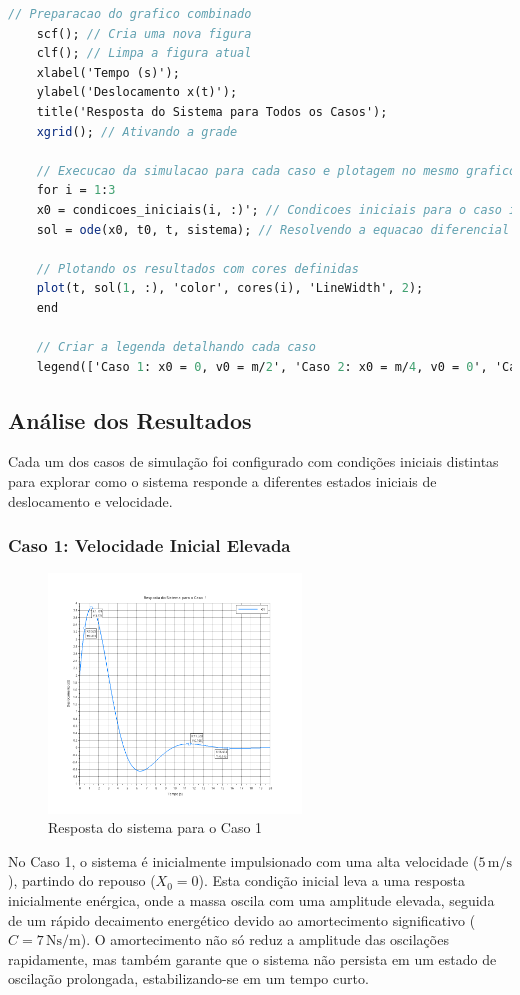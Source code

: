 \begin{lstlisting}[language=Scilab, caption=Código Scilab para simular a resposta do sistema massa-mola-amortecedor]
    // Preparacao do grafico combinado
    scf(); // Cria uma nova figura
    clf(); // Limpa a figura atual
    xlabel('Tempo (s)');
    ylabel('Deslocamento x(t)');
    title('Resposta do Sistema para Todos os Casos');
    xgrid(); // Ativando a grade

    // Execucao da simulacao para cada caso e plotagem no mesmo grafico
    for i = 1:3
    x0 = condicoes_iniciais(i, :)'; // Condicoes iniciais para o caso i (transposto para coluna)
    sol = ode(x0, t0, t, sistema); // Resolvendo a equacao diferencial

    // Plotando os resultados com cores definidas
    plot(t, sol(1, :), 'color', cores(i), 'LineWidth', 2);
    end

    // Criar a legenda detalhando cada caso
    legend(['Caso 1: x0 = 0, v0 = m/2', 'Caso 2: x0 = m/4, v0 = 0', 'Caso 3: x0 = m/5, v0 = m/3'], "location", "best");
\end{lstlisting}

\subsection{Análise dos Resultados}
Cada um dos casos de simulação foi configurado com condições iniciais distintas para explorar como o sistema responde a diferentes estados iniciais de deslocamento e velocidade.

\subsubsection{Caso 1: Velocidade Inicial Elevada}
\begin{figure}[H]
    \centering
    \includegraphics[width=0.6\textwidth]{atividades/1-atividade/assets/caso1.png}
    \caption{Resposta do sistema para o Caso 1}
\end{figure}
No Caso 1, o sistema é inicialmente impulsionado com uma alta velocidade (\(5 \, \text{m/s}\)), partindo do repouso (\(X_0 = 0\)). Esta condição inicial leva a uma resposta inicialmente enérgica, onde a massa oscila com uma amplitude elevada, seguida de um rápido decaimento energético devido ao amortecimento significativo (\(C = 7 \, \text{Ns/m}\)). O amortecimento não só reduz a amplitude das oscilações rapidamente, mas também garante que o sistema não persista em um estado de oscilação prolongada, estabilizando-se em um tempo curto.

